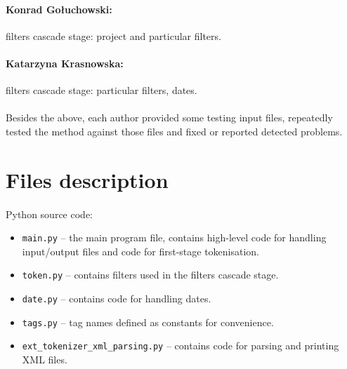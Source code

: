\documentclass[oneside,12pt]{article}
\begin{document}
\paragraph{Konrad Gołuchowski:} filters cascade stage: project and particular filters.

\paragraph{Katarzyna Krasnowska:} filters cascade stage: particular filters, dates.

\paragraph{}
Besides the above, each author provided some testing input files, repeatedly tested the method against those files and fixed or reported detected problems. 

\section{Files description}

\paragraph{}
Python source code:
\begin{itemize}
    \item \texttt{main.py} -- the main program file, contains high-level code for handling input/output files and code for first-stage tokenisation.
    
    \item \texttt{token.py} -- contains filters used in the filters cascade stage.
    
    \item \texttt{date.py} -- contains code for handling dates.
    
    \item \texttt{tags.py} -- tag names defined as constants for convenience.
    
    \item \texttt{ext\_tokenizer\_xml\_parsing.py} -- contains code for parsing and printing XML files.
\end{itemize}
\end{document}
